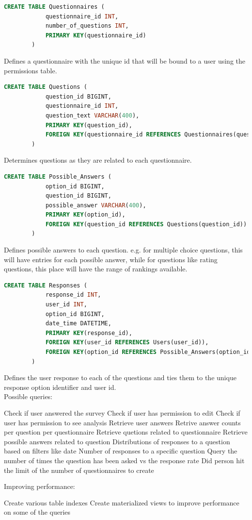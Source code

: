 \documentclass[12pt, oneside, a4paper]{article}
\begin{document}
    \begin{lstlisting}[language=SQL, columns=flexible]
        CREATE TABLE Questionnaires (
            questionnaire_id INT,
            number_of_questions INT, 
            PRIMARY KEY(questionnaire_id)
        ) 
    \end{lstlisting}
    Defines a questionnaire with the unique id that will be bound to a user using the permissions table. 
    \\

    \begin{lstlisting}[language=SQL, columns=flexible]
        CREATE TABLE Questions ( 
            question_id BIGINT,
            questionnaire_id INT,
            question_text VARCHAR(400), 
            PRIMARY KEY(question_id),
            FOREIGN KEY(questionnaire_id REFERENCES Questionnaires(questionnaire_id))
        ) 
    \end{lstlisting}
    Determines questions as they are related to each questionnaire. 
    \\

    \begin{lstlisting}[language=SQL, columns=flexible]
        CREATE TABLE Possible_Answers (
            option_id BIGINT,
            question_id BIGINT, 
            possible_answer VARCHAR(400),
            PRIMARY KEY(option_id),
            FOREIGN KEY(question_id REFERENCES Questions(question_id))
        ) 
    \end{lstlisting}
    Defines possible answers to each question. e.g. for multiple choice questions, this will have entries for each possible answer, while for questions like rating questions, this place will have the range of rankings available. 
    \\

    \begin{lstlisting}[language=SQL, columns=flexible]
        CREATE TABLE Responses (
            response_id INT,
            user_id INT,
            option_id BIGINT, 
            date_time DATETIME,
            PRIMARY KEY(response_id),
            FOREIGN KEY(user_id REFERENCES Users(user_id)), 
            FOREIGN KEY(option_id REFERENCES Possible_Answers(option_id))
        ) 
    \end{lstlisting}
    Defines the user response to each of the questions and ties them to the unique response option identifier and user id.
    \\

    Possible queries:   
    \begin{outline}
        \1 Check if user answered the survey
        \1 Check if user has permission to edit 
        \1 Check if user has permission to see analysis
        \1 Retrieve user answers
        \1 Retrive answer counts per question per questionnaire
        \1 Retrieve quetions related to questionnaire
        \1 Retrieve possible answers related to question
        \1 Distributions of responses to a question based on filters like date
        \1 Number of responses to a specific question
        \1 Query the number of times the question has been asked vs the response rate
        \1 Did person hit the limit of the number of questionnaires to create
    \end{outline}
    
    Improving performance:
    \begin{outline}
        \1 Create various table indexes
        \1 Create materialized views to improve performance on some of the queries
    \end{outline}
\end{document}

